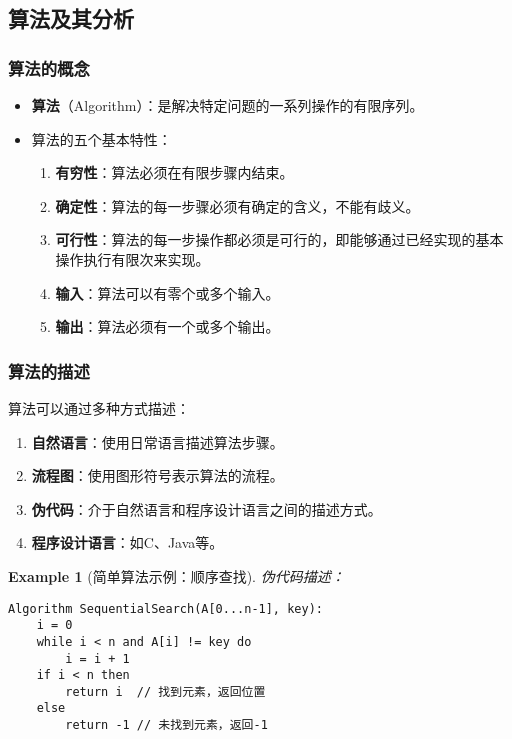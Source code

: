 \documentclass{../../note}
\newtheorem{example}{Example}
\begin{document}
\subsection{算法及其分析}

\subsubsection{算法的概念}
\begin{itemize}
  \item \textbf{算法}（Algorithm）：是解决特定问题的一系列操作的有限序列。
  \item 算法的五个基本特性：
    \begin{enumerate}
      \item \textbf{有穷性}：算法必须在有限步骤内结束。
      \item \textbf{确定性}：算法的每一步骤必须有确定的含义，不能有歧义。
      \item \textbf{可行性}：算法的每一步操作都必须是可行的，即能够通过已经实现的基本操作执行有限次来实现。
      \item \textbf{输入}：算法可以有零个或多个输入。
      \item \textbf{输出}：算法必须有一个或多个输出。
    \end{enumerate}
\end{itemize}

\subsubsection{算法的描述}
算法可以通过多种方式描述：
\begin{enumerate}
  \item \textbf{自然语言}：使用日常语言描述算法步骤。
  \item \textbf{流程图}：使用图形符号表示算法的流程。
  \item \textbf{伪代码}：介于自然语言和程序设计语言之间的描述方式。
  \item \textbf{程序设计语言}：如C、Java等。
\end{enumerate}

\begin{example}[简单算法示例：顺序查找]
  伪代码描述：
\begin{verbatim}
Algorithm SequentialSearch(A[0...n-1], key):
    i = 0
    while i < n and A[i] != key do
        i = i + 1
    if i < n then
        return i  // 找到元素，返回位置
    else
        return -1 // 未找到元素，返回-1
\end{verbatim}
\end{example}
\end{document}
